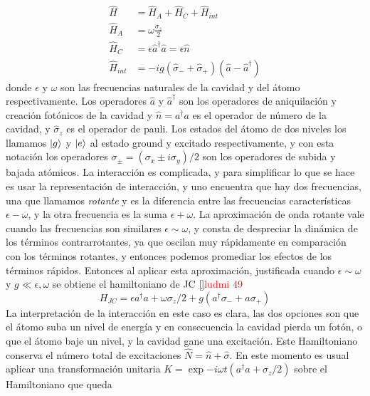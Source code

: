 \begin{equation}\label{eq3:hamiltoniano inicial}
\begin{aligned}
    \hat H & = \hat H_A + \hat H_C + \hat H_{int}  \\
    \hat H_A &= \omega \frac{\sigma_z}{2} \\
    \hat H_C &= \epsilon \hat a^\dagger\hat a = \epsilon \hat n \\
    \hat H_{int} &= -i g (\hat\sigma_-+\hat \sigma_+)(\hat a - \hat a^\dagger)
\end{aligned}
\end{equation}
donde $\epsilon$ y $\omega$ son las frecuencias naturales de la cavidad y del átomo respectivamente. Los operadores $\hat a$ y $\hat a^\dagger$ son los operadores de aniquilaci\'on y creaci\'on fot\'onicos de la cavidad y $\hat n =a^\dagger a$ es el operador de n\'umero de la cavidad, y $\hat \sigma_z$ es el operador de pauli. Los estados del átomo de dos niveles los llamamos $\ket{g}$ y $\ket{e}$ al estado ground y excitado respectivamente, y con esta notación los operadores $\sigma_\pm = (\sigma_x\pm i\sigma_y)/2$ son los operadores de subida y bajada atómicos. 
La interacci\'on es complicada, y para simplificar lo que se hace es usar la representaci\'on de interacci\'on, y uno encuentra que hay dos frecuencias, una que llamamos \textit{rotante} y es la diferencia entre las frecuencias características $\epsilon-\omega$, y la otra frecuencia es la suma $\epsilon+\omega$. La aproximación de onda rotante vale cuando las frecuencias son similares $\epsilon\sim\omega$, y consta de despreciar la dinámica de los términos contrarrotantes, ya que oscilan muy rápidamente en comparación con los términos rotantes, y entonces podemos promediar los efectos de los términos rápidos. Entonces al aplicar esta aproximación, justificada cuando $\epsilon\sim\omega$ y $g \ll \epsilon,\omega$ se obtiene el hamiltoniano de JC \ref{}\textcolor{red}{ludmi 49}
\begin{equation}
    H_{JC}=\epsilon a^\dagger a + \omega \sigma_z/2 + g(a^\dagger\sigma_-+a\sigma_+)
\end{equation} 
La interpretaci\'on de la interacci\'on en este caso es clara, las dos opciones son que el átomo suba un nivel de energ\'ia y en consecuencia la cavidad pierda un fot\'on, o que el átomo baje un nivel, y la cavidad gane una excitaci\'on. Este Hamiltoniano conserva el n\'umero total de excitaciones $\hat N= \hat n + \hat \sigma$. En este momento es usual aplicar una transformación unitaria $K=\exp{-i\omega t(a ^\dagger a + \sigma_z/2)}$ sobre el Hamiltoniano que queda 
